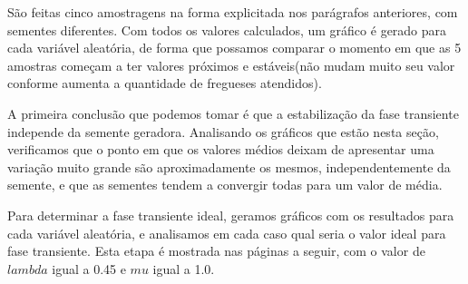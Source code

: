 \documentclass[a4paper,10pt]{article}
\begin{document}
    São feitas cinco amostragens na forma explicitada nos parágrafos anteriores, com sementes diferentes. Com todos os valores calculados, um gráfico é gerado para cada variável aleatória, de forma que possamos comparar o momento em que as 5 amostras começam a ter valores próximos e estáveis(não mudam muito seu valor conforme aumenta a quantidade de fregueses atendidos).

    A primeira conclusão que podemos tomar é que a estabilização da fase transiente independe da semente geradora. Analisando os gráficos que estão nesta seção, verificamos que o ponto em que os valores médios deixam de apresentar uma variação muito grande são aproximadamente os mesmos, independentemente da semente, e que as sementes tendem a convergir todas para um valor de média.

    Para determinar a fase transiente ideal, geramos gráficos com os resultados para cada variável aleatória, e analisamos em cada caso qual seria o valor ideal para fase transiente. Esta etapa é mostrada nas páginas a seguir, com o valor de $lambda$ igual a 0.45 e $mu$ igual a 1.0.

\pagebreak
\end{document}
